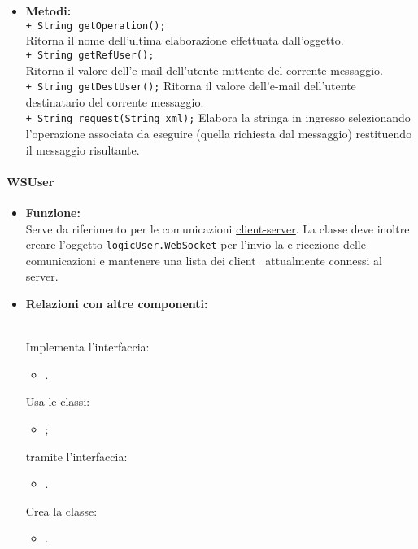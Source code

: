 {{\begin{sloppypar}
{{{\begin{itemize}
			\item[] \textbf{Metodi:}{ \\
				\texttt{+ String getOperation();}\\
				Ritorna il nome dell'ultima elaborazione effettuata dall'oggetto.\\
					
				\texttt{+ String getRefUser();}\\
				Ritorna il valore dell'e-mail dell'utente mittente del corrente messaggio.\\
					
				\texttt{+ String getDestUser();}
				Ritorna il valore dell'e-mail dell'utente destinatario del corrente messaggio.\\
					
				\texttt{+ String request(String xml);}
				Elabora la stringa in ingresso selezionando l'operazione associata da eseguire (quella richiesta dal messaggio) restituendo il messaggio risultante.\\
			}
			\end{itemize}
		}

		\paragraph{WSUser}\label{par:WSUser}{
			\begin{itemize}
				\item[] \textbf{Funzione:}\\
					Serve da riferimento per le comunicazioni \underline{client-server}\g. La classe deve inoltre creare l'oggetto \texttt{logicUser.WebSocket} per l'invio la e ricezione delle comunicazioni e mantenere una lista dei client\g~ attualmente connessi al server\g.\\
			
				\item[] \textbf{Relazioni con altre componenti:}{\\			
					Implementa l'interfaccia: 
						\begin{itemize}
							\item[] .
						\end{itemize}
					Usa le classi:
						\begin{itemize}
							\item[] ;
						\end{itemize}
					tramite l'interfaccia:
						\begin{itemize}
							\item[].
						\end{itemize}
					Crea la classe:
						\begin{itemize}
							\item[].\\
						\end{itemize}
				}
				

\end{itemize}}}}
\end{sloppypar}}}
